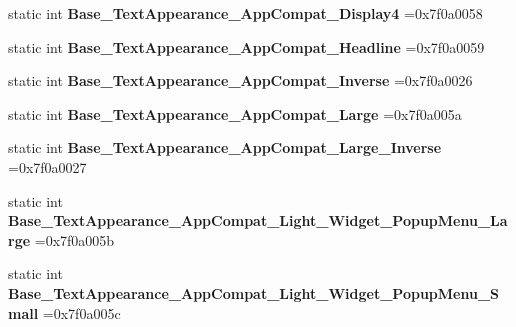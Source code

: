 \begin{DoxyCompactItemize}
static int {\bfseries Base\+\_\+\+Text\+Appearance\+\_\+\+App\+Compat\+\_\+\+Display4} =0x7f0a0058
\item 
\mbox{\label{classandroid_1_1support_1_1graphics_1_1drawable_1_1R_1_1style_aa735f5f14b749582aff55f7a64d9493d}} 
static int {\bfseries Base\+\_\+\+Text\+Appearance\+\_\+\+App\+Compat\+\_\+\+Headline} =0x7f0a0059
\item 
\mbox{\label{classandroid_1_1support_1_1graphics_1_1drawable_1_1R_1_1style_a99f115e5fdd3bd1c047363cebc637ef1}} 
static int {\bfseries Base\+\_\+\+Text\+Appearance\+\_\+\+App\+Compat\+\_\+\+Inverse} =0x7f0a0026
\item 
\mbox{\label{classandroid_1_1support_1_1graphics_1_1drawable_1_1R_1_1style_affe8b08b20552f5067a8ddbe211c5887}} 
static int {\bfseries Base\+\_\+\+Text\+Appearance\+\_\+\+App\+Compat\+\_\+\+Large} =0x7f0a005a
\item 
\mbox{\label{classandroid_1_1support_1_1graphics_1_1drawable_1_1R_1_1style_aab1bc5842cac6e69b79c1b9d0580ff47}} 
static int {\bfseries Base\+\_\+\+Text\+Appearance\+\_\+\+App\+Compat\+\_\+\+Large\+\_\+\+Inverse} =0x7f0a0027
\item 
\mbox{\label{classandroid_1_1support_1_1graphics_1_1drawable_1_1R_1_1style_aef7c263f27869ad73cfaecf1505cbf96}} 
static int {\bfseries Base\+\_\+\+Text\+Appearance\+\_\+\+App\+Compat\+\_\+\+Light\+\_\+\+Widget\+\_\+\+Popup\+Menu\+\_\+\+Large} =0x7f0a005b
\item 
\mbox{\label{classandroid_1_1support_1_1graphics_1_1drawable_1_1R_1_1style_ad5955d738919e897ed9a1742ed23681a}} 
static int {\bfseries Base\+\_\+\+Text\+Appearance\+\_\+\+App\+Compat\+\_\+\+Light\+\_\+\+Widget\+\_\+\+Popup\+Menu\+\_\+\+Small} =0x7f0a005c
\item 
\mbox{\label{classandroid_1_1support_1_1graphics_1_1drawable_1_1R_1_1style_a7b74e73e244d4add19caa12c633a935a}} 

\end{DoxyCompactItemize}
